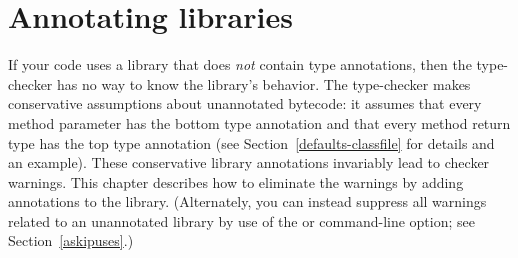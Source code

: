 \htmlhr
\chapter{Annotating libraries\label{annotating-libraries}}


%
%


If your code uses a library that does \emph{not} contain type annotations,
then the type-checker has no way to know the library's behavior.
The type-checker
makes conservative assumptions about unannotated bytecode:  it assumes that
every method parameter has the bottom type annotation and that every method
return type has the top type annotation (see
Section~\ref{defaults-classfile} for details and an example).
These conservative library
annotations invariably lead to checker warnings.
This chapter describes how to eliminate
the warnings by adding annotations to the library.
(Alternately, you can instead
suppress all warnings related to an unannotated library by use of the
 or  command-line option; see
Section~\ref{askipuses}.)

